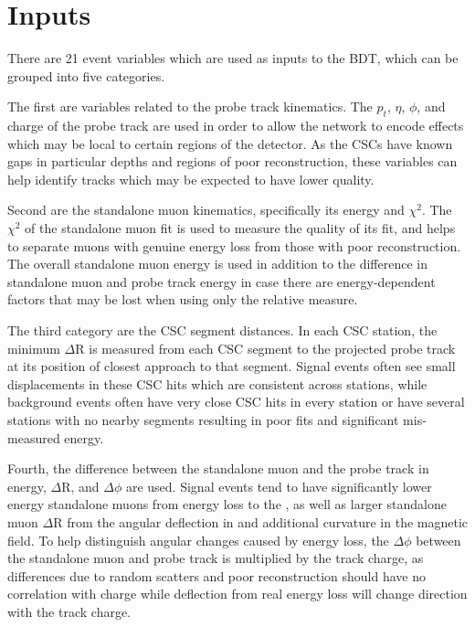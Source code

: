 \section{Inputs}
There are 21 event variables which are used as inputs to the BDT, which can be grouped into five categories.

The first are variables related to the probe track kinematics. 
The $p_t$, $\eta$, $\phi$, and charge of the probe track are used in order to allow the network to encode effects which may be local to certain regions of the detector.
As the CSCs have known gaps in particular depths and regions of poor reconstruction, these variables can help identify tracks which may be expected to have lower quality.

Second are the standalone muon kinematics, specifically its energy and $\chi^{2}$. %
The $\chi^{2}$ of the standalone muon fit is used to measure the quality of its fit, and helps to separate muons with genuine energy loss from those with poor reconstruction.
The overall standalone muon energy is used in addition to the difference in standalone muon and probe track energy in case there are energy-dependent factors that may be lost when using only the relative measure.


The third category are the CSC segment distances.
In each CSC station, the minimum $\Delta$R is measured from each CSC segment to the projected probe track at its position of closest approach to that segment.
Signal events often see small displacements in these CSC hits which are consistent across stations, while background events often have very close CSC hits in every station or have several stations with no nearby segments resulting in poor fits and significant mis-measured energy.

Fourth, the difference between the standalone muon and the probe track in energy, $\Delta$R, and $\Delta \phi$ are used.
Signal events tend to have significantly lower energy standalone muons from energy loss to the \aprime, as well as larger standalone muon $\Delta$R from the angular deflection in \dbrem and additional curvature in the magnetic field.
To help distinguish angular changes caused by energy loss, the $\Delta \phi$ between the standalone muon and probe track is multiplied by the track charge, as differences due to random scatters and poor reconstruction should have no correlation with charge while deflection from real energy loss will change direction with the track charge.

